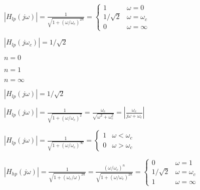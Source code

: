 \documentclass{article}
\def\lthtmlcheckvsize{\ifdim\ht\sizebox<\vsize 
  \ifdim\wd\sizebox<\hsize\expandafter\hfill\fi \expandafter\vfill
  \else\expandafter\vss\fi}%
\begin{document}
{\newpage\clearpage
{}%
$\displaystyle \left| H_{lp}(j\omega)\right|=\frac{1}{\sqrt{1+(\omega/\omega_c)^{2n}}}
  =\left\{\begin{array}{ll}1 & \omega=0\\1/\sqrt{2}&\omega=\omega_c\\
  0 & \omega=\infty\end{array}\right.
  $%
\lthtmlindisplaymathZ
\lthtmlcheckvsize\clearpage}

{\newpage\clearpage
{}%
$|H_{lp}(j\omega_c)|
  =1/\sqrt{2}$%
\lthtmlindisplaymathZ
\lthtmlcheckvsize\clearpage}

{\newpage\clearpage
{}%
$n=0$%
\lthtmlindisplaymathZ
\lthtmlcheckvsize\clearpage}

{\newpage\clearpage
{}%
$n=1$%
\lthtmlindisplaymathZ
\lthtmlcheckvsize\clearpage}

{\newpage\clearpage
{}%
$n=\infty$%
\lthtmlindisplaymathZ
\lthtmlcheckvsize\clearpage}

{\newpage\clearpage
{}%
$|H_{lp}(j\omega)|=1/\sqrt{2}$%
\lthtmlindisplaymathZ
\lthtmlcheckvsize\clearpage}

{\newpage\clearpage
{}%
$\displaystyle |H_{lp}(j\omega)|=\frac{1}{\sqrt{1+(\omega/\omega_c)^2}}
    =\frac{\omega_c}{\sqrt{\omega^2+\omega_c^2}}
    =\left|\frac{\omega_c}{j\omega+\omega_c}\right|
    $%
\lthtmlindisplaymathZ
\lthtmlcheckvsize\clearpage}

{\newpage\clearpage
{}%
$\displaystyle |H_{lp}(j\omega)|=\frac{1}{\sqrt{1+(\omega/\omega_c)^\infty}}  
    =\left\{\begin{array}{ll}1&\omega<\omega_c\\0&\omega>\omega_c\end{array}
    \right.
    $%
\lthtmlindisplaymathZ
\lthtmlcheckvsize\clearpage}

{\newpage\clearpage
{}%
$\displaystyle \left| H_{hp}(j\omega)\right|=\frac{1}{\sqrt{1+(\omega_c/\omega)^{2n}}}
  =\frac{(\omega/\omega_c)^n}{\sqrt{1+(\omega/\omega_c)^{2n}}}
  =\left\{\begin{array}{ll}0 & \omega=1\\1/\sqrt{2}&\omega=\omega_c\\
  1 & \omega=\infty\end{array}\right.
  $%
\lthtmlindisplaymathZ
\lthtmlcheckvsize\clearpage}
\end{document}
